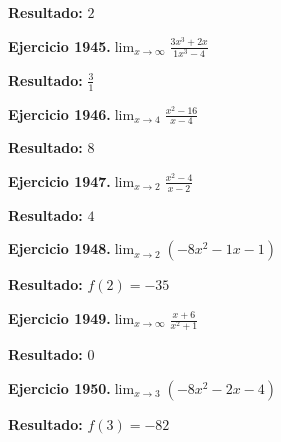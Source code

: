 \documentclass[10pt,a4paper]{article}
\begin{document}
\begin{solbox}
\textbf{Resultado:} \(\displaystyle 2\)
\end{solbox}

\newpage
\begin{ejbox}
\textbf{Ejercicio 1945.}\quad $\lim_{x\to \infty} \frac{3x^3 + 2x}{1x^3 - 4}$
\end{ejbox}

\begin{solbox}
\textbf{Resultado:} \(\displaystyle \frac{3}{1}\)
\end{solbox}

\begin{ejbox}
\textbf{Ejercicio 1946.}\quad $\lim_{x\to 4} \frac{x^2-16}{x-4}$
\end{ejbox}

\begin{solbox}
\textbf{Resultado:} \(\displaystyle 8\)
\end{solbox}

\begin{ejbox}
\textbf{Ejercicio 1947.}\quad $\lim_{x\to 2} \frac{x^2-4}{x-2}$
\end{ejbox}

\begin{solbox}
\textbf{Resultado:} \(\displaystyle 4\)
\end{solbox}

\newpage
\begin{ejbox}
\textbf{Ejercicio 1948.}\quad $\lim_{x\to 2} (-8x^2 -1x -1)$
\end{ejbox}

\begin{solbox}
\textbf{Resultado:} \(\displaystyle f(2) = -35\)
\end{solbox}

\begin{ejbox}
\textbf{Ejercicio 1949.}\quad $\lim_{x\to \infty} \frac{x + 6}{x^2 + 1}$
\end{ejbox}

\begin{solbox}
\textbf{Resultado:} \(\displaystyle 0\)
\end{solbox}

\begin{ejbox}
\textbf{Ejercicio 1950.}\quad $\lim_{x\to 3} (-8x^2 -2x -4)$
\end{ejbox}

\begin{solbox}
\textbf{Resultado:} \(\displaystyle f(3) = -82\)
\end{solbox}
\end{document}

